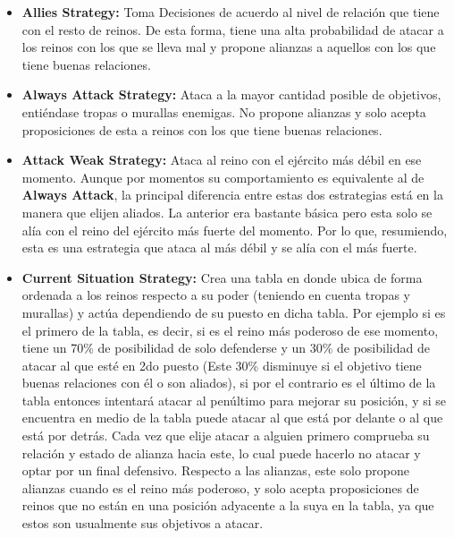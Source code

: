 \documentclass[11pt]{article}
\begin{document}
        \begin{itemize}
            \item \textbf{Allies Strategy:} Toma Decisiones de acuerdo al nivel de relación que tiene con el 
            resto de reinos. De esta forma, tiene una alta probabilidad de atacar a los reinos con los que se 
            lleva mal y propone alianzas a aquellos con los que tiene buenas relaciones.

            \item \textbf{Always Attack Strategy:} Ataca a la mayor cantidad posible de objetivos, entiéndase 
            tropas o murallas enemigas. No propone alianzas y solo acepta proposiciones de esta a reinos con los 
            que tiene buenas relaciones.

            \item \textbf{Attack Weak Strategy:} Ataca al reino con el ejército más débil en ese momento. Aunque 
            por momentos su comportamiento es equivalente al de \textbf{Always Attack}, la principal diferencia 
            entre estas dos estrategias está en la manera que elijen aliados. La anterior era bastante básica pero 
            esta solo se alía con el reino del ejército más fuerte del momento. Por lo que, resumiendo, esta es una 
            estrategia que ataca al más débil y se alía con el más fuerte.

            \item \textbf{Current Situation Strategy:} Crea una tabla en donde ubica de forma ordenada a los reinos 
            respecto a su poder (teniendo en cuenta tropas y murallas) y actúa dependiendo de su puesto en dicha tabla. 
            Por ejemplo si es el primero de la tabla, es decir, si es el reino más poderoso de ese momento, tiene un 70\% 
            de posibilidad de solo defenderse y un 30\% de posibilidad de atacar al que esté en 2do puesto (Este 30\% disminuye 
            si el objetivo tiene buenas relaciones con él o son aliados), si por el contrario es el último de la tabla entonces 
            intentará atacar al penúltimo para mejorar su posición, y si se encuentra en medio de la tabla puede atacar al que 
            está por delante o al que está por detrás. Cada vez que elije atacar a alguien primero comprueba su relación y estado 
            de alianza hacia este, lo cual puede hacerlo no atacar y optar por un final defensivo. Respecto a las alianzas, 
            este solo propone alianzas cuando es el reino más poderoso, y solo acepta proposiciones de reinos que no están en 
            una posición adyacente a la suya en la tabla, ya que estos son usualmente sus objetivos a atacar.


\end{itemize}
\end{document}
